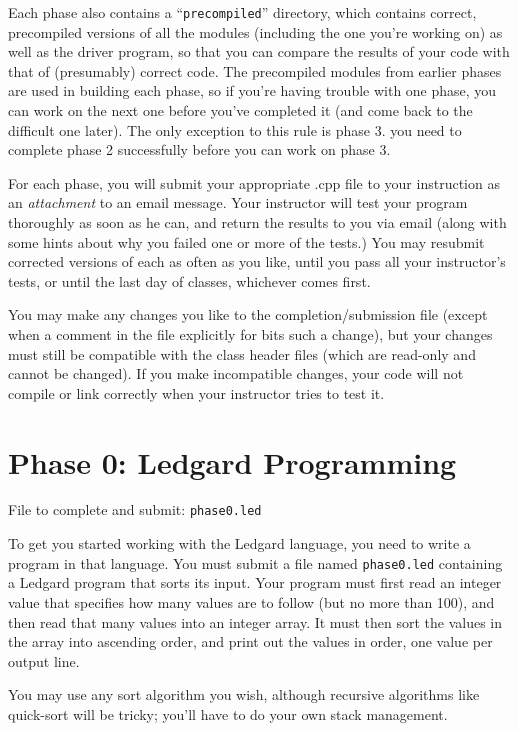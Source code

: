 \documentclass{article}
\begin{document}
Each phase also contains a ``\texttt{precompiled}'' directory, which contains
correct, precompiled versions of all the modules (including the one
you're working on) as well as the driver program, so that you can
compare the results of your code with that of (presumably) correct
code.  The precompiled modules from earlier phases are used in
building each phase, so if you're having trouble with one phase, you
can work on the next one before you've completed it (and come back to
the difficult one later).  The only exception to this rule is phase 3.
you need to complete phase 2 successfully before you can work on phase
3.

For each phase, you will submit your appropriate .cpp file to your
instruction as an {\em attachment} to an email message.  Your
instructor will test your program thoroughly as soon as he can, and
return the results to you via email (along with some hints about why
you failed one or more of the tests.)  You may resubmit corrected
versions of each as often as you like, until you pass all your
instructor's tests, or until the last day of classes, whichever comes
first.

You may make any changes you like to the completion/submission file
(except when a comment in the file explicitly for bits such a change),
but your changes must still be compatible with the class header files
(which are read-only and cannot be changed).  If you make incompatible
changes, your code will not compile or link correctly when your
instructor tries to test it.

\section{Phase 0: Ledgard Programming}
File to complete and submit: \texttt{phase0.led}

To get you started working with the Ledgard language, you need to
write a program in that language. You must submit a file named
\texttt{phase0.led} containing a Ledgard program that sorts its input.
Your program must first read an integer value that specifies how many
values are to follow (but no more than 100), and then read that many
values into an integer array. It must then sort the values in the
array into ascending order, and print out the values in order, one
value per output line.

You may use any sort algorithm you wish, although recursive algorithms
like quick-sort will be tricky; you'll have to do your own stack
management.
\end{document}

